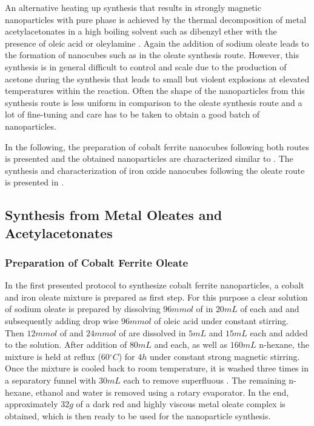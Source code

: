 \documentclass[\main/dresen_thesis.tex]{subfiles}
\begin{document}
  An alternative heating up synthesis that results in strongly magnetic nanoparticles with pure phase is achieved by the thermal decomposition of metal acetylacetonates in a high boiling solvent such as dibenzyl ether with the presence of oleic acid or oleylamine \cite{Sun_2002_SizeC, Wu_2014_Monol}.
  Again the addition of sodium oleate leads to the formation of nanocubes such as in the oleate synthesis route.
  However, this synthesis is in general difficult to control and scale due to the production of acetone during the synthesis that leads to small but violent explosions at elevated temperatures within the reaction.
  Often the shape of the nanoparticles from this synthesis route is less uniform in comparison to the oleate synthesis route and a lot of fine-tuning and care has to be taken to obtain a good batch of nanoparticles.

  In the following, the preparation of cobalt ferrite nanocubes following both routes is presented and the obtained nanoparticles are characterized similar to .
  The synthesis and characterization of iron oxide nanocubes following the oleate route is presented in .

  \subsection{Synthesis from Metal Oleates and Acetylacetonates}\label{sec:monolayers:nanoparticle:synthesisOleatesAcAc}
    \subsubsection{Preparation of Cobalt Ferrite Oleate}
      In the first presented protocol to synthesize cobalt ferrite nanoparticles, a cobalt and iron oleate mixture is prepared as first step.
      For this purpose a clear solution of sodium oleate is prepared by dissolving $96 \unit{mmol}$ of  in $20 \unit{mL}$ of each  and  and subsequently adding drop wise $96 \unit{mmol}$ of oleic acid under constant stirring.
      Then $12 \unit{mmol}$ of  and $24 \unit{mmol}$ of  are dissolved in $5 \unit{mL}$  and $15 \unit{mL}$  each and added to the solution.
      After addition of $80 \unit{mL}$  and  each, as well as $160 \unit{mL}$ n-hexane, the mixture is held at reflux ($60 \unit{^\circ C}$) for $4 \unit{h}$ under constant strong magnetic stirring.
      Once the mixture is cooled back to room temperature, it is washed three times in a separatory funnel with $30 \unit{mL}$  each to remove superfluous .
      The remaining n-hexane, ethanol and water is removed using a rotary evaporator.
      In the end, approximately $32 \unit{g}$ of a dark red and highly viscous metal oleate complex is obtained, which is then ready to be used for the nanoparticle synthesis.
\end{document}
